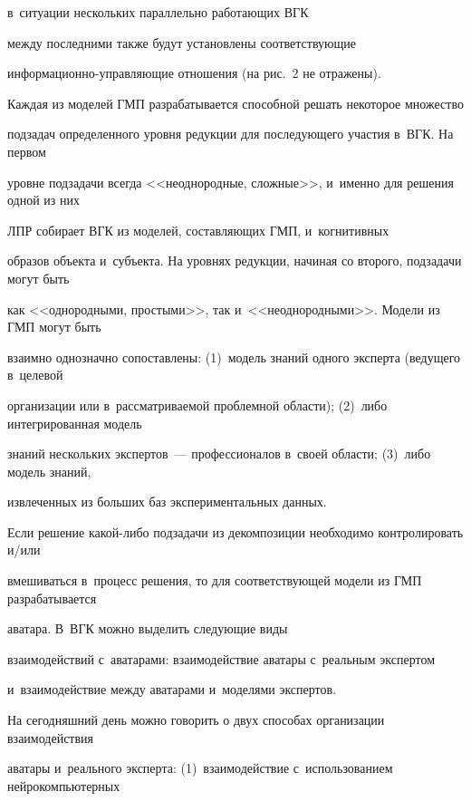 в~ситуации нескольких параллельно работающих ВГК 


между последними также будут установлены соответствующие  


ин\-фор\-ма\-ци\-он\-но-управ\-ля\-ющие отношения (на рис.~2 не отражены).











  Каждая из моделей ГМП разрабатывается способной решать некоторое множество 


подзадач определенного уровня редукции для последующего участия в~ВГК. На первом 


уровне подзадачи всегда <<неоднородные, сложные>>, и~именно для решения одной из них 


ЛПР собирает ВГК из моделей, составляющих ГМП, и~когнитивных 


образов объекта и~субъекта. На уровнях редукции, начиная со второго, подзадачи могут быть 


как <<однородными, простыми>>, так и~<<неоднородными>>. Модели из ГМП могут быть 


взаимно однозначно сопоставлены: (1)~модель знаний одного эксперта (ведущего в~целевой 


организации или в~рассматриваемой проб\-лем\-ной об\-ласти); (2)~либо интегрированная модель 


знаний нескольких экспертов~--- профессионалов в~своей области; (3)~либо модель знаний, 


извлеченных из больших баз экспериментальных данных.


  


  Если решение какой-либо подзадачи из декомпозиции необходимо контролировать и/или 


вмешиваться в~процесс решения, то для соответствующей модели из ГМП разрабатывается 


аватара. В~ВГК можно выделить следующие виды 


взаимодействий с~аватарами: взаимодействие аватары с~реальным экспертом 


и~взаимодействие между аватарами и~моделями экспертов. 


  


  На сегодняшний день можно говорить о двух способах организации взаимодействия 


аватары и~реального эксперта: (1)~взаимодействие с~использованием нейрокомпьютерных 


